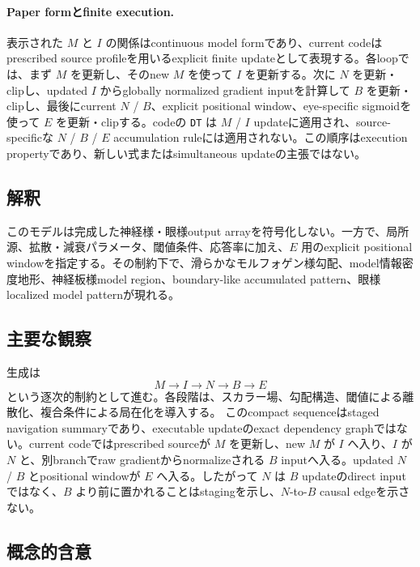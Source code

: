 \documentclass[11pt]{ltjsarticle}
\newcommand{\I}{I}
\begin{document}
\paragraph{Paper formとfinite execution.}
表示された \(M\) と \(\I\) の関係はcontinuous model formであり、current codeはprescribed source profileを用いるexplicit finite updateとして表現する。各loopでは、まず \(M\) を更新し、そのnew \(M\) を使って \(\I\) を更新する。次に \(N\) を更新・clipし、updated \(\I\) からglobally normalized gradient inputを計算して \(B\) を更新・clipし、最後にcurrent \(N\) / \(B\)、explicit positional window、eye-specific sigmoidを使って \(E\) を更新・clipする。codeの \texttt{DT} は \(M\) / \(\I\) updateに適用され、source-specificな \(N\) / \(B\) / \(E\) accumulation ruleには適用されない。この順序はexecution propertyであり、新しい式またはsimultaneous updateの主張ではない。

\subsection{解釈}

このモデルは完成した神経様・眼様output arrayを符号化しない。一方で、局所源、拡散・減衰パラメータ、閾値条件、応答率に加え、\(E\) 用のexplicit positional windowを指定する。その制約下で、滑らかなモルフォゲン様勾配、model情報密度地形、神経板様model region、boundary-like accumulated pattern、眼様localized model patternが現れる。

\subsection{主要な観察}

生成は
\begin{equation}
  M\rightarrow \I\rightarrow N\rightarrow B\rightarrow E
\end{equation}
という逐次的制約として進む。各段階は、スカラー場、勾配構造、閾値による離散化、複合条件による局在化を導入する。
このcompact sequenceはstaged navigation summaryであり、executable updateのexact dependency graphではない。current codeではprescribed sourceが \(M\) を更新し、new \(M\) が \(\I\) へ入り、\(\I\) が \(N\) と、別branchでraw gradientからnormalizeされる \(B\) inputへ入る。updated \(N\) / \(B\) とpositional windowが \(E\) へ入る。したがって \(N\) は \(B\) updateのdirect inputではなく、\(B\) より前に置かれることはstagingを示し、\(N\)-to-\(B\) causal edgeを示さない。

\subsection{概念的含意}
\end{document}
